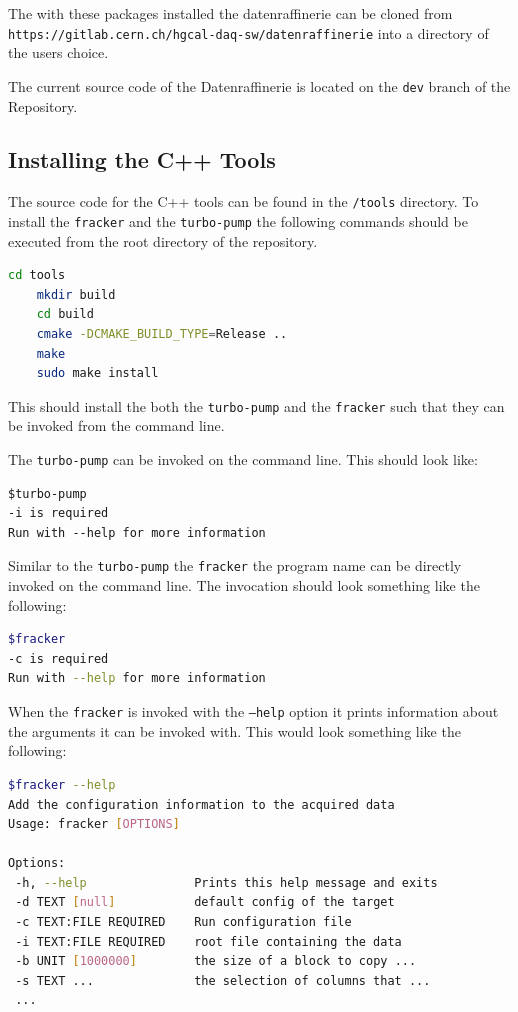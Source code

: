 \documentclass[11pt]{article}
\begin{document}
The with these packages installed the datenraffinerie can be cloned from \texttt{https://gitlab.cern.ch/hgcal-daq-sw/datenraffinerie} into a directory of the users choice.

The current source code of the Datenraffinerie is located on the \texttt{dev} branch of the Repository.

\subsection{Installing the C++ Tools}
The source code for the C++ tools can be found in the \texttt{/tools} directory. To install the \texttt{fracker} and the \texttt{turbo-pump} the following commands should be executed from the root directory of the repository.
\begin{lstlisting}[language=bash]
	cd tools
	mkdir build
	cd build
	cmake -DCMAKE_BUILD_TYPE=Release ..
	make
	sudo make install
\end{lstlisting}
This should install the both the \texttt{turbo-pump} and the \texttt{fracker} such that they can be invoked from the command line.

The \texttt{turbo-pump} can be invoked on the command line. This should look like:
\begin{lstlisting}
$turbo-pump
-i is required
Run with --help for more information
\end{lstlisting}

Similar to the \texttt{turbo-pump} the \texttt{fracker} the program name can be directly invoked on the command line. The invocation should look something like the following:
\begin{lstlisting}[language=bash]
$fracker
-c is required
Run with --help for more information
\end{lstlisting}

When the \texttt{fracker} is invoked with the \texttt{--help} option it prints information about the arguments it can be invoked with. This would look something like the following:
\begin{lstlisting}[language=bash]
$fracker --help
Add the configuration information to the acquired data
Usage: fracker [OPTIONS]
	
Options:
 -h, --help               Prints this help message and exits
 -d TEXT [null]           default config of the target
 -c TEXT:FILE REQUIRED    Run configuration file  
 -i TEXT:FILE REQUIRED    root file containing the data
 -b UNIT [1000000]        the size of a block to copy ...
 -s TEXT ...              the selection of columns that ...
 ...
\end{lstlisting}
\end{document}
